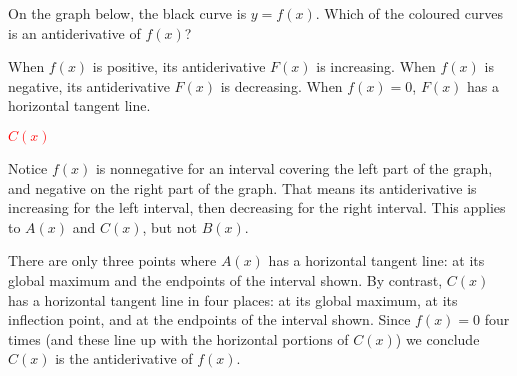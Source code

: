 \begin{Mquestion}
On the graph below, the black curve is $y=f(x)$. Which of the coloured curves is an antiderivative of $f(x)$?
\begin{center}\end{center}
\end{Mquestion}
\begin{hint}
When $f(x)$ is positive, its antiderivative $F(x)$ is increasing. When $f(x)$ is negative, its antiderivative $F(x)$ is decreasing. When $f(x)=0$, $F(x)$ has a horizontal tangent line.
\end{hint}
\begin{answer}
\textcolor{red}{$C(x)$}
\end{answer}
\begin{solution}
Notice $f(x)$ is nonnegative for an interval covering the left part of the graph, and negative on the right part of the graph. That means its antiderivative is increasing for the left interval, then decreasing for the right interval. This applies to $A(x)$ and $C(x)$, but not $B(x)$.

There are only three points where $A(x)$ has a horizontal tangent line: at its global maximum and the endpoints of the interval shown. By contrast, $C(x)$ has a horizontal tangent line in four places: at its global maximum,  at its inflection point, and at the endpoints of the interval shown. Since $f(x)=0$ four times (and these line up with the horizontal portions of $C(x)$) we conclude  $C(x)$ is the antiderivative of $f(x)$.
\end{solution}



\subsection*{\Procedural}


